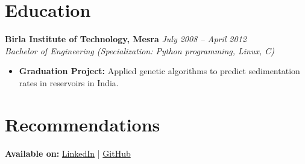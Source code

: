 \documentclass[a4paper,10pt]{article}
\begin{document}
\section*{Education}
\textbf{Birla Institute of Technology, Mesra} \hfill \textit{July 2008 – April 2012} \\
\textit{Bachelor of Engineering (Specialization: Python programming, Linux, C)}  
\begin{itemize}[leftmargin=0.15in]
    \item \textbf{Graduation Project:} Applied genetic algorithms to predict sedimentation rates in reservoirs in India.
\end{itemize}

\section*{Recommendations}
\textbf{Available on:} \href{https://www.linkedin.com/in/vinitatlinkedin/details/recommendations/}{LinkedIn} |
\href{https://github.com/vinitkumar}{GitHub} 
\end{document}
